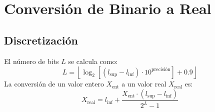 \documentclass[11pt, letterpaper]{article}
\begin{document}
	\section*{Conversión de Binario a Real}
	
	\subsection*{Discretización}
	El número de bits $L$ se calcula como:
	\[
	L = \left\lfloor \log_2 \left[ (l_{\text{sup}} - l_{\text{inf}}) \cdot 10^{\text{precisión}} \right] + 0.9 \right\rfloor
	\]
	La conversión de un valor entero $X_{\text{ent}}$ a un valor real $X_{\text{real}}$ es:
	\[
	X_{\text{real}} = l_{\text{inf}} + \dfrac{X_{\text{ent}} \cdot (l_{\text{sup}} - l_{\text{inf}})}{2^L - 1}
	\]
	
\end{document}
